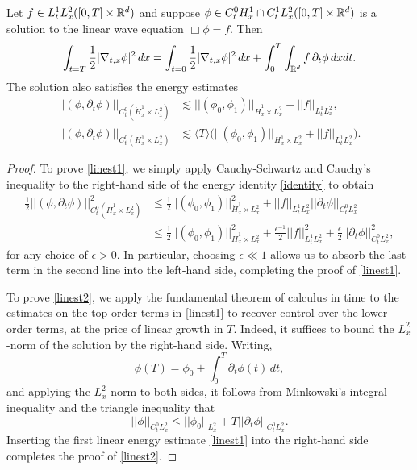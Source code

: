 \begin{proposition}
    Let $f \in L^1_t L^2_x ([0, T] \times \mathbb R^d)$ and suppose $\phi \in C^0_t  H^1_x \cap C^1_t L^2_x ([0, T] \times \mathbb R^d)$ is a solution to the linear wave equation $\Box \phi = f$. Then 
        \begin{equation}\label{eq:identity}
            \int_{t = T} \frac12 |\nabla_{t, x} \phi|^2 \, dx 
                = \int_{t = 0} \frac12 |\nabla_{t, x} \phi|^2 \, dx + \int_0^T \int_{\mathbb R^d} f \, \partial_t \phi \, dx dt. 
        \end{equation}
    The solution also satisfies the energy estimates
        \begin{align}
            || (\phi, \partial_t \phi) ||_{C^0_t (\dot H^1_x \times L^2_x)} 
                &\lesssim   || (\phi_0, \phi_1) ||_{\dot H^1_x \times L^2_x} + ||f||_{L^1_t L^2_x},\label{eq:linest1}
            \\
            || (\phi, \partial_t \phi) ||_{C^0_t (H^1_x \times L^2_x)} 
            &\lesssim \langle T \rangle  \Big( || (\phi_0, \phi_1) ||_{H^1_x \times L^2_x} + ||f||_{L^1_t L^2_x}\Big)\label{eq:linest2}. 
        \end{align}
\end{proposition}

\begin{proof}
    To prove \eqref{linest1}, we simply apply Cauchy-Schwartz and Cauchy's inequality to the right-hand side of the energy identity \eqref{identity} to obtain 
        \begin{align*}
           \frac12 || (\phi, \partial_t \phi) ||_{C^0_t (\dot H^1_x \times L^2_x)}^2
                &\leq \frac12 || (\phi_0, \phi_1) ||_{\dot H^1_x \times L^2_x}^2 + ||f||_{L^1_t L^2_x} ||\partial_t \phi||_{C^0_t L^2_x} \\
                &\leq \frac12 || (\phi_0, \phi_1) ||_{\dot H^1_x \times L^2_x}^2 +\frac{\epsilon^{-1}}{2} ||f||_{L^1_t L^2_x}^2 + \frac{\epsilon}{2} ||\partial_t \phi||_{C^0_t L^2_x}^2,
        \end{align*}
    for any choice of $\epsilon > 0$. In particular, choosing $\epsilon \ll 1$ allows us to absorb the last term in the second line into the left-hand side, completing the proof of \eqref{linest1}. 

    To prove \eqref{linest2}, we apply the fundamental theorem of calculus in time to the estimates on the top-order terms in \eqref{linest1} to recover control over the lower-order terms, at the price of linear growth in $T$. Indeed, it suffices to bound the $L^2_x$-norm of the solution by the right-hand side. Writing,
        \[
            \phi(T) = \phi_0 + \int_0^T \partial_t \phi (t) \, dt, 
        \]
    and applying the $L^2_x$-norm to both sides, it follows from Minkowski's integral inequality and the triangle inequality that 
        \[
            ||\phi||_{C^0_t L^2_x} 
                \leq ||\phi_0||_{L^2_x} + T ||\partial_t \phi||_{C^0_t L^2_x}. 
        \]
    Inserting the first linear energy estimate \eqref{linest1} into the right-hand side completes the proof of \eqref{linest2}. 
\end{proof}

